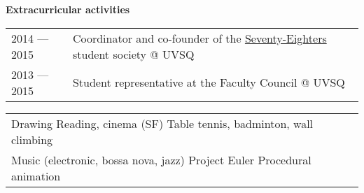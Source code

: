 {\large\bf Extracurricular activities}
\hrulefill\\[.3cm]
{\setlength{\extrarowheight}{.15cm}
\begin{tabularx}{\textwidth}{lX}
2014 \---- 2015 &
Coordinator and co-founder of the
\href{https://www.facebook.com/pages/Seventy-Eighters/508772502567015}
{Seventy-Eighters} student society
\makeatletter @ \makeatother UVSQ \\
2013 \---- 2015 &
Student representative at the Faculty Council
\makeatletter @ \makeatother UVSQ
\end{tabularx}}
\newline
{\setlength{\extrarowheight}{.15cm}
\begin{tabularx}{\textwidth}{X}
Drawing \hfill
Reading, cinema (SF) \hfill
Table tennis, badminton, wall climbing \\
Music (electronic, bossa nova, jazz) \hfill
Project Euler \hfill
Procedural animation
\end{tabularx}}
